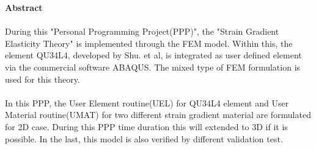 \documentclass[12pt]{article}
\begin{document}
	\clearpage
    \textbf{\LARGE Abstract}\\
    \\
    During this "Personal Programming Project(PPP)", the "Strain Gradient Elasticity Theory" is implemented through the FEM model. Within this, the element QU34L4, developed by Shu. et al, is integrated as user defined element via the commercial software ABAQUS. The mixed type of FEM formulation is used for this theory.
    \\
    \\
    In this PPP, the User Element routine(UEL) for QU34L4 element and User Material routine(UMAT) for two different strain gradient material are formulated for 2D case.
    During this PPP time duration this will extended to 3D if it is possible. In the last, this model is also verified by different validation test. 



    \newpage
    	\listoffigures
    	\listoftables
    \clearpage
    \tableofcontents
    \clearpage
\end{document}
